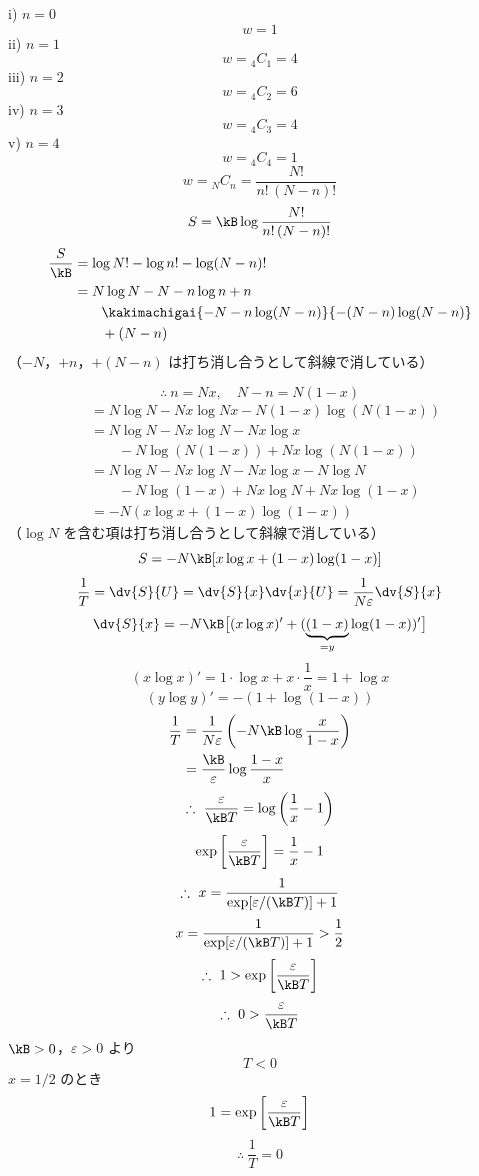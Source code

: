 i) $n=0$
\[ w=1 \]
ii) $n=1$
\[ w={}_{4}C_{1}=4 \]
iii) $n=2$
\[ w={}_{4}C_{2}=6 \]
iv) $n=3$
\[ w={}_{4}C_{3}=4 \]
v) $n=4$
\[ w={}_{4}C_{4}=1 \]
\[ w={}_{N}C_{n}=\frac{N!}{n!\,(N-n)!} \]
\[ S=\kB\log\frac{N!}{n!\,(N-n)!} \]
\begin{align*}
\frac{S}{\kB}&=\log N!-\log n!-\log(N-n)!\\
&=N\log N-N-n\log n+n\\
&\qquad\kakimachigai{-N-n\log(N-n)}{-(N-n)\log(N-n)}\\
&\qquad+(N-n)
\end{align*}
（$-N$，$+n$，$+(N-n)$ は打ち消し合うとして斜線で消している）

\[ \therefore\ n=Nx,\quad N-n=N(1-x) \]
\begin{align*}
&=N\log N-Nx\log Nx-N(1-x)\log(N(1-x))\\
&=N\log N-Nx\log N-Nx\log x\\
&\qquad-N\log(N(1-x))+Nx\log(N(1-x))\\
&=N\log N-Nx\log N-Nx\log x-N\log N\\
&\qquad-N\log(1-x)+Nx\log N+Nx\log(1-x)\\
&=-N(x\log x+(1-x)\log(1-x))
\end{align*}
（$\log N$ を含む項は打ち消し合うとして斜線で消している）
\[ S=-N\kB[x\log x+(1-x)\log(1-x)] \]
\[ \frac{1}{T}=\dv{S}{U}=\dv{S}{x}\dv{x}{U}=\frac{1}{N\varepsilon}\dv{S}{x} \]
\[ \dv{S}{x}=-N\kB\bigl[(x\log x)'+(\underbrace{(1-x)}_{=y}\log(1-x))'\bigr] \]
\[ (x\log x)'=1\cdot\log x+x\cdot\frac{1}{x}=1+\log x \]
\[ (y\log y)'=-(1+\log(1-x)) \]
\begin{align*}
\frac{1}{T}&=\frac{1}{N\varepsilon}\left(-N\kB\log\frac{x}{1-x}\right)\\
&=\frac{\kB}{\varepsilon}\log\frac{1-x}{x}
\end{align*}
\[ \therefore\ \frac{\varepsilon}{\kB T}=\log\left(\frac{1}{x}-1\right) \]
\[ \exp\left[\frac{\varepsilon}{\kB T}\right]=\frac{1}{x}-1 \]
\[ \therefore\ x=\frac{1}{\exp[\varepsilon/(\kB T)]+1} \]
\[ x=\frac{1}{\exp[\varepsilon/(\kB T)]+1}>\frac{1}{2} \]
\[ \therefore\ 1>\exp\left[\frac{\varepsilon}{\kB T}\right] \]
\[ \therefore\ 0>\frac{\varepsilon}{\kB T} \]
$\kB>0$，$\varepsilon>0$ より
\[ T<0 \]
$x=1/2$ のとき
\[ 1=\exp\left[\frac{\varepsilon}{\kB T}\right] \]
\[ \therefore\ \frac{1}{T}=0 \]
